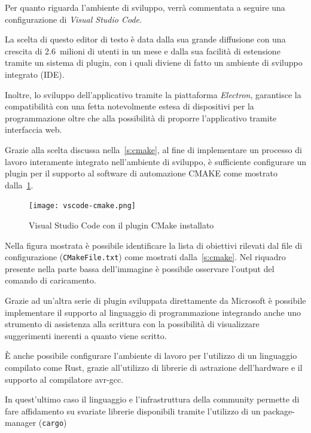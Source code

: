Per quanto riguarda l'ambiente di sviluppo, verrà commentata a seguire una configurazione di \textit{Visual Studio Code}.

La scelta di questo editor di testo è data dalla sua grande diffusione con una crescita di \SI{2.6}{milioni} di utenti in un mese\cite{site:vscode-connect-2017} e dalla sua facilità di estensione tramite un sistema di plugin, con i quali diviene di fatto un ambiente di sviluppo integrato (IDE).

Inoltre, lo sviluppo dell'applicativo tramite la piattaforma \textit{Electron}\cite{site:vscode-about}, garantisce la compatibilità con una fetta notevolmente estesa di dispositivi per la programmazione oltre che alla possibilità di proporre l'applicativo tramite interfaccia web\cite{site:electron}. 

Grazie alla scelta discussa nella~\cref{s:cmake}, al fine di implementare un processo di lavoro interamente integrato nell'ambiente di sviluppo, è sufficiente configurare un plugin per il supporto al software di automazione CMAKE come mostrato dalla~\cref{fig:vscode-cmake-plugin}.\@

\begin{figure}
    \centering
    \texttt{[image: vscode-cmake.png]}
    \caption[Immagine del software Visual Studio Code]{Visual Studio Code con il plugin CMake installato}\label{fig:vscode-cmake-plugin}
\end{figure}

Nella figura mostrata è possibile identificare la lista di obiettivi rilevati dal file di configurazione (\texttt{CMakeFile.txt}) come mostrati dalla~\cref{s:cmake}. Nel riquadro presente nella parte bassa dell'immagine è possibile osservare l'output del comando di caricamento.

Grazie ad un'altra serie di plugin sviluppata direttamente da Microsoft è possibile implementare il supporto al linguaggio di programmazione integrando anche uno strumento di assistenza alla scrittura con la possibilità di visualizzare suggerimenti inerenti a quanto viene scritto.

È anche possibile configurare l'ambiente di lavoro per l'utilizzo di un linguaggio compilato come Rust\cite{site:avrrust}, grazie all'utilizzo di librerie di astrazione dell'hardware\cite{site:arduino-hal-rust} e il supporto al compilatore avr-gcc.

In quest'ultimo caso il linguaggio e l'infrastruttura della community permette di fare affidamento su svariate librerie disponibili tramite l'utilizzo di un package-manager (\texttt{cargo}\cite{site:cargo-book})

